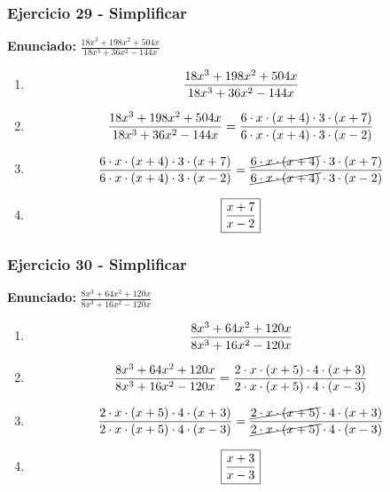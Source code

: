 \documentclass[11pt,a4paper]{article}
\newcommand{\fitmath}[1]{%
\[
\setbox0=\hbox{$\displaystyle #1$}%
\ifdim\wd0>\linewidth
\resizebox{\linewidth}{!}{$\displaystyle #1$}%
\else
#1%
\fi
\]
}
\begin{document}
\vspace{0.12cm}
\subsubsection*{Ejercicio 29 - Simplificar}
\textbf{Enunciado:} $ \frac{18 x^{3} + 198 x^{2} + 504 x}{18 x^{3} + 36 x^{2} - 144 x} $\par
\begin{enumerate}[leftmargin=2em]
\item \fitmath{\frac{18 x^{3} + 198 x^{2} + 504 x}{18 x^{3} + 36 x^{2} - 144 x}}
\item \fitmath{\frac{18 x^{3} + 198 x^{2} + 504 x}{18 x^{3} + 36 x^{2} - 144 x}=\frac{6\cdot x\cdot \left(x + 4\right)\cdot 3\cdot \left(x + 7\right)}{6\cdot x\cdot \left(x + 4\right)\cdot 3\cdot \left(x - 2\right)}}
\item \fitmath{\frac{6\cdot x\cdot \left(x + 4\right)\cdot 3\cdot \left(x + 7\right)}{6\cdot x\cdot \left(x + 4\right)\cdot 3\cdot \left(x - 2\right)}=\frac{\cancel{6\cdot x\cdot \left(x + 4\right)}\cdot 3\cdot \left(x + 7\right)}{\cancel{6\cdot x\cdot \left(x + 4\right)}\cdot 3\cdot \left(x - 2\right)}}
\item \fitmath{\boxed{\frac{x + 7}{x - 2}}}
\end{enumerate}

\vspace{0.12cm}
\subsubsection*{Ejercicio 30 - Simplificar}
\textbf{Enunciado:} $ \frac{8 x^{3} + 64 x^{2} + 120 x}{8 x^{3} + 16 x^{2} - 120 x} $\par
\begin{enumerate}[leftmargin=2em]
\item \fitmath{\frac{8 x^{3} + 64 x^{2} + 120 x}{8 x^{3} + 16 x^{2} - 120 x}}
\item \fitmath{\frac{8 x^{3} + 64 x^{2} + 120 x}{8 x^{3} + 16 x^{2} - 120 x}=\frac{2\cdot x\cdot \left(x + 5\right)\cdot 4\cdot \left(x + 3\right)}{2\cdot x\cdot \left(x + 5\right)\cdot 4\cdot \left(x - 3\right)}}
\item \fitmath{\frac{2\cdot x\cdot \left(x + 5\right)\cdot 4\cdot \left(x + 3\right)}{2\cdot x\cdot \left(x + 5\right)\cdot 4\cdot \left(x - 3\right)}=\frac{\cancel{2\cdot x\cdot \left(x + 5\right)}\cdot 4\cdot \left(x + 3\right)}{\cancel{2\cdot x\cdot \left(x + 5\right)}\cdot 4\cdot \left(x - 3\right)}}
\item \fitmath{\boxed{\frac{x + 3}{x - 3}}}
\end{enumerate}
\end{document}
